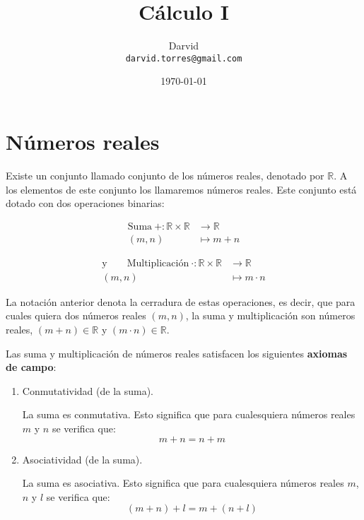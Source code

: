 \documentclass[11pt]{article}
\newcommand{\R}{\mathbb{R}}
\begin{document}
\title{\vspace{-2cm}Cálculo I}
\author{Darvid \\ \texttt{darvid.torres@gmail.com}}
\date{\today}
\maketitle
\thispagestyle{empty}

\section*{Números reales}

Existe un conjunto llamado conjunto de los números reales, denotado por $\R$. A los elementos de este conjunto los llamaremos números reales. Este conjunto está dotado con dos operaciones binarias:\vspace{-0.5cm}
\begin{center}
\noindent\begin{minipage}[r]{5.5cm}
\begin{align*}
    \text{Suma} \ + : \R \times \R &\to \R\\
    (m,n) &\mapsto m+n
\end{align*}
\end{minipage}%
\begin{minipage}[l]{6.5cm}
\begin{align*}
    \text{y} \qquad \text{Multiplicación} \ \cdot : \R \times \R &\to \R\\
    (m,n) &\mapsto m \cdot n
\end{align*}
\end{minipage}
\end{center}

La notación anterior denota la cerradura de estas operaciones, es decir, que para cuales quiera dos números reales $(m,n)$, la suma y multiplicación son números reales, $(m+n)\in \R$ y $(m\cdot n)\in \R$.

Las suma y multiplicación de números reales satisfacen los siguientes \textbf{axiomas de campo}:

\begin{enumerate}[label=S\arabic*.]
    \item Conmutatividad (de la suma).
    
    La suma es conmutativa. Esto significa que para cualesquiera números reales $m$ y $n$ se verifica que:\[ m+n = n+m
    \]
    \item Asociatividad (de la suma).
    
    La suma es asociativa. Esto significa que para cualesquiera números reales $m$, $n$ y $l$ se verifica que: \[(m+ n)+l = m+(n+ l)
    \]
\end{enumerate}
\end{document}
